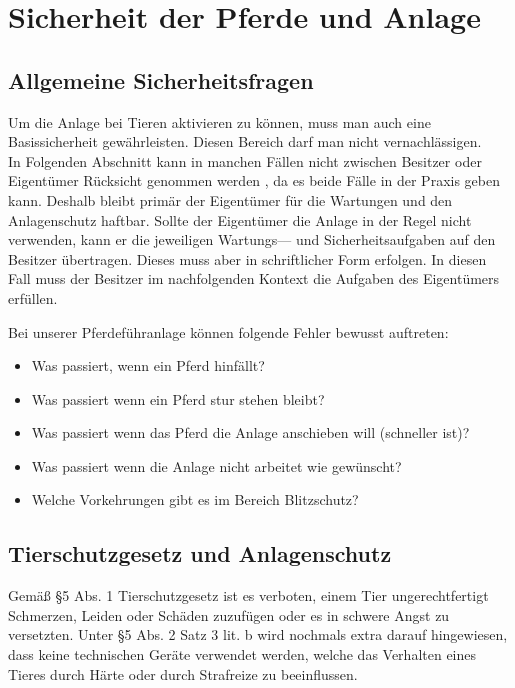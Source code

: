 \documentclass[12pt]{scrreprt} %
\begin{document}
\section{Sicherheit der Pferde und Anlage}
\label{sec:sicherheitDerPferdeUndAnlage}

\subsection{Allgemeine Sicherheitsfragen}
\label{sec:allgemeineSicherheitsfragen}

Um die Anlage bei Tieren aktivieren zu können, muss man auch eine Basissicherheit gewährleisten.
Diesen Bereich darf man nicht vernachlässigen. \\ In Folgenden Abschnitt  kann in manchen Fällen nicht zwischen Besitzer oder Eigentümer Rücksicht genommen werden , da es beide Fälle in der Praxis geben kann. Deshalb bleibt primär der Eigentümer für die Wartungen und den Anlagenschutz haftbar. Sollte der Eigentümer die Anlage in der Regel nicht verwenden, kann er die jeweiligen Wartungs--- und Sicherheitsaufgaben auf den Besitzer übertragen. Dieses muss aber in schriftlicher Form erfolgen. In diesen Fall muss der Besitzer im nachfolgenden Kontext die Aufgaben des Eigentümers erfüllen.

Bei unserer Pferdeführanlage können folgende Fehler bewusst auftreten:

\begin{itemize}
\item{Was passiert, wenn ein Pferd hinfällt?}
\item{Was passiert wenn ein Pferd stur stehen bleibt?}
\item{Was passiert wenn das Pferd die Anlage anschieben will (schneller ist)?}
\item{Was passiert wenn die Anlage nicht arbeitet wie gewünscht?}
\item{Welche Vorkehrungen gibt es im Bereich Blitzschutz?}
\end{itemize}

\subsection{Tierschutzgesetz und Anlagenschutz}
\label{sec:tierschutzgesetzUndAnlagenschutz}

Gemäß §5 Abs. 1 Tierschutzgesetz ist es verboten, 
einem Tier ungerechtfertigt Schmerzen, Leiden oder Schäden zuzufügen oder es in schwere Angst zu versetzten. 
Unter §5 Abs. 2 Satz 3 lit. b wird nochmals extra darauf hingewiesen, dass keine technischen Geräte verwendet werden, welche das Verhalten eines Tieres durch Härte oder durch Strafreize zu beeinflussen. 
\end{document}
